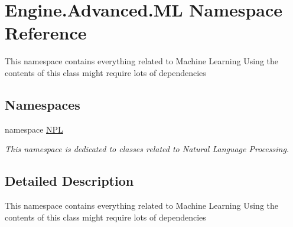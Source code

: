 \hypertarget{namespace_engine_1_1_advanced_1_1_m_l}{}\section{Engine.\+Advanced.\+ML Namespace Reference}
\label{namespace_engine_1_1_advanced_1_1_m_l}


This namespace contains everything related to Machine Learning Using the contents of this class might require lots of dependencies  


\subsection*{Namespaces}
\begin{DoxyCompactItemize}
\item 
namespace \mbox{\hyperlink{namespace_engine_1_1_advanced_1_1_m_l_1_1_n_p_l}{N\+PL}}
\begin{DoxyCompactList}\small\item\em This namespace is dedicated to classes related to Natural Language Processing. \end{DoxyCompactList}\end{DoxyCompactItemize}


\subsection{Detailed Description}
This namespace contains everything related to Machine Learning Using the contents of this class might require lots of dependencies 

